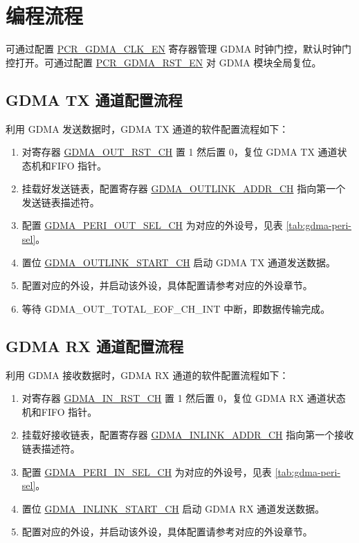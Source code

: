 \documentclass[main\_\_CN.tex]{subfiles}
\begin{document}
\section{编程流程}


可通过配置 \hyperref[fielddesc:PCRGDMACLKEN]{PCR\_GDMA\_CLK\_EN} 寄存器管理 GDMA 时钟门控，默认时钟门控打开。可通过配置 \hyperref[fielddesc:PCRGDMARSTEN]{PCR\_GDMA\_RST\_EN} 对 GDMA 模块全局复位。


\subsection{GDMA TX 通道配置流程}
利用 GDMA 发送数据时，GDMA TX 通道的软件配置流程如下：
\begin{enumerate}
    \item 对寄存器 \hyperref[fielddesc:GDMAOUTRSTCHN]{GDMA\_OUT\_RST\_CH} 置 1 然后置 0，复位 GDMA TX 通道状态机和FIFO 指针。
    \item 挂载好发送链表，配置寄存器 \hyperref[fielddesc:GDMAOUTLINKADDRCHN]{GDMA\_OUTLINK\_ADDR\_CH} 指向第一个发送链表描述符。
    \item 配置 \hyperref[fielddesc:GDMAPERIOUTSELCHN]{GDMA\_PERI\_OUT\_SEL\_CH} 为对应的外设号，见表 \ref{tab:gdma-peri-sel}。
    \item 置位 \hyperref[fielddesc:GDMAOUTLINKSTARTCHN]{GDMA\_OUTLINK\_START\_CH} 启动 GDMA TX 通道发送数据。
    \item 配置对应的外设，并启动该外设，具体配置请参考对应的外设章节。
    \item 等待 GDMA\_OUT\_TOTAL\_EOF\_CH\_INT 中断，即数据传输完成。
\end{enumerate}

\subsection{GDMA RX 通道配置流程}
利用 GDMA 接收数据时，GDMA RX 通道的软件配置流程如下：
\begin{enumerate}
    \item 对寄存器 \hyperref[fielddesc:GDMAINRSTCHN]{GDMA\_IN\_RST\_CH} 置 1 然后置 0，复位 GDMA RX 通道状态机和FIFO 指针。
    \item 挂载好接收链表，配置寄存器 \hyperref[fielddesc:GDMAINLINKADDRCHN]{GDMA\_INLINK\_ADDR\_CH} 指向第一个接收链表描述符。
    \item 配置 \hyperref[fielddesc:GDMAPERIINSELCHN]{GDMA\_PERI\_IN\_SEL\_CH} 为对应的外设号，见表 \ref{tab:gdma-peri-sel}。
    \item 置位 \hyperref[fielddesc:GDMAINLINKSTARTCHN]{GDMA\_INLINK\_START\_CH} 启动 GDMA RX 通道发送数据。
    \item 配置对应的外设，并启动该外设，具体配置请参考对应的外设章节。
\end{enumerate}
\end{document}
